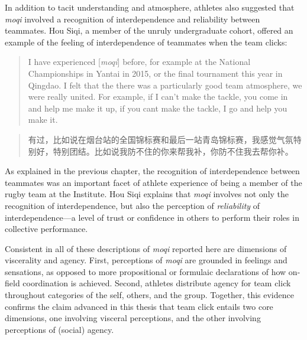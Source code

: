 \begin{CJK}{UTF8}{gbsn}
In addition to tacit understanding and atmosphere, athletes also suggested that \textit{moqi} involved a recognition of interdependence and reliability between teammates.  Hou Siqi, a member of the unruly undergraduate cohort, offered an example of the feeling of interdependence of teammates when the team clicks:

  \begin{quote}
    I have experienced [\textit{moqi}] before, for example at the National Championships in Yantai in 2015, or the final tournament this year in Qingdao.  I felt that the there was a particularly good team atmosphere, we were really united.  For example, if I can't make the tackle, you come in and help me make it up, if you cant make the tackle, I go and help you make it.
  \end{quote}

  \begin{quote}
    有过，比如说在烟台站的全国锦标赛和最后一站青岛锦标赛，我感觉气氛特别好，特别团结。比如说我防不住的你来帮我补，你防不住我去帮你补。
  \end{quote}

As explained in the previous chapter, the recognition of interdependence between teammates was an important facet of athlete experience of being a member of the rugby team at the Institute.  Hou Siqi explains that \textit{moqi} involves not only the recognition of interdependence, but also the perception of \textit{reliability} of interdependence---a level of trust or confidence in others to perform their roles in collective performance.


Consistent in all of these descriptions of \textit{moqi} reported here are dimensions of viscerality and agency.  First, perceptions of \textit{moqi} are grounded in feelings and sensations, as opposed to more propositional or formulaic declarations of how on-field coordination is achieved.  Second, athletes distribute agency for team click throughout categories of the self, others, and the group.  Together, this evidence confirms the claim advanced in this thesis that team click entails two core dimensions, one involving visceral perceptions, and the other involving perceptions of (social) agency.



\end{CJK}
